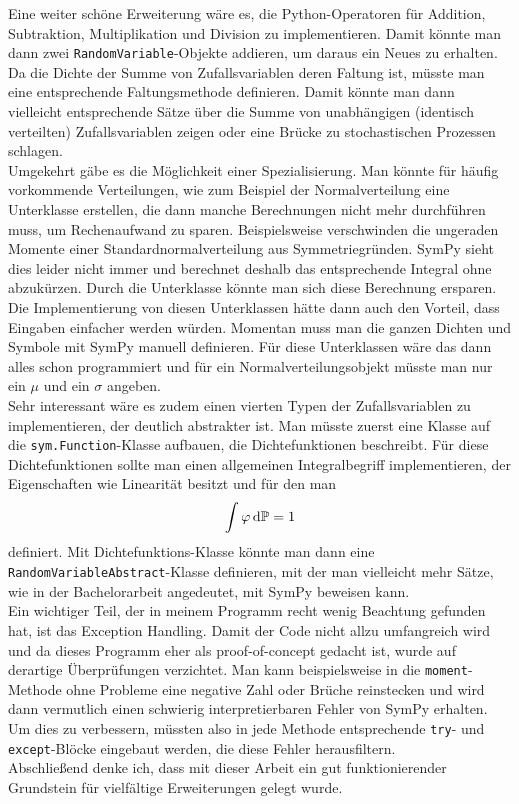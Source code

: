 Eine weiter schöne Erweiterung wäre es, die Python-Operatoren für Addition, Subtraktion, Multiplikation und Division zu implementieren. Damit könnte man dann zwei \lstinline|RandomVariable|-Objekte addieren, um daraus ein Neues zu erhalten. Da die Dichte der Summe von Zufallsvariablen deren Faltung ist, müsste man eine entsprechende Faltungsmethode definieren. Damit könnte man dann vielleicht entsprechende Sätze über die Summe von unabhängigen (identisch verteilten) Zufallsvariablen \glqq zeigen\grqq{} oder eine Brücke zu stochastischen Prozessen schlagen.\\

Umgekehrt gäbe es die Möglichkeit einer Spezialisierung. Man könnte für häufig vorkommende Verteilungen, wie zum Beispiel der Normalverteilung eine Unterklasse erstellen, die dann manche Berechnungen nicht mehr durchführen muss, um Rechenaufwand zu sparen. Beispielsweise verschwinden die ungeraden Momente einer Standardnormalverteilung aus Symmetriegründen. SymPy sieht dies leider nicht immer und berechnet deshalb das entsprechende Integral ohne abzukürzen. Durch die Unterklasse könnte man sich diese Berechnung ersparen. Die Implementierung von diesen Unterklassen hätte dann auch den Vorteil, dass Eingaben einfacher werden würden. Momentan muss man die ganzen Dichten und Symbole mit SymPy manuell definieren. Für diese Unterklassen wäre das dann alles schon programmiert und für ein Normalverteilungsobjekt müsste man nur ein $\mu$ und ein $\sigma$ angeben.\\

Sehr interessant wäre es zudem einen vierten Typen der Zufallsvariablen zu implementieren, der deutlich abstrakter ist. Man müsste zuerst eine Klasse auf die \lstinline|sym.Function|-Klasse aufbauen, die Dichtefunktionen beschreibt. Für diese Dichtefunktionen sollte man einen allgemeinen Integralbegriff implementieren, der Eigenschaften wie Linearität besitzt und für den man
\[\int \varphi \mathop{}\!\mathrm{d} \mathbb{P} = 1\]
definiert. Mit Dichtefunktions-Klasse könnte man dann eine \lstinline|RandomVariableAbstract|-Klasse definieren, mit der man vielleicht mehr Sätze, wie in der Bachelorarbeit angedeutet, mit SymPy \glqq beweisen\grqq{} kann.\\

Ein wichtiger Teil, der in meinem Programm recht wenig Beachtung gefunden hat, ist das Exception Handling. Damit der Code nicht allzu umfangreich wird und da dieses Programm eher als proof-of-concept gedacht ist, wurde auf derartige Überprüfungen verzichtet. Man kann beispielsweise in die \lstinline|moment|-Methode ohne Probleme eine negative Zahl oder Brüche reinstecken und wird dann vermutlich einen schwierig interpretierbaren Fehler von SymPy erhalten. Um dies zu verbessern, müssten also in jede Methode entsprechende \lstinline|try|- und \lstinline|except|-Blöcke eingebaut werden, die diese Fehler herausfiltern.\\

Abschließend denke ich, dass mit dieser Arbeit ein gut funktionierender Grundstein für vielfältige Erweiterungen gelegt wurde.